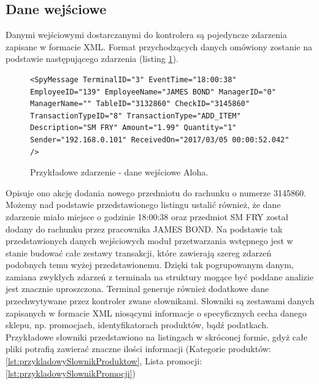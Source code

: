 \documentclass[a4paper]{book}
\begin{document}
\subsection{Dane wejściowe}
Danymi wejściowymi dostarczanymi do kontrolera są pojedyncze zdarzenia zapisane w formacie XML.
Format przychodzących danych omówiony zostanie na podstawie następującego zdarzenia (listing \ref{lst:przykladoweZdarzenieAloha}).  
\begin{figure}[h]
	\begin{lstlisting}[frame=single, breaklines=true]
	<SpyMessage TerminalID="3" EventTime="18:00:38" EmployeeID="139" EmployeeName="JAMES BOND" ManagerID="0" ManagerName="" TableID="3132860" CheckID="3145860" TransactionTypeID="8" TransactionType="ADD_ITEM" Description="SM FRY" Amount="1.99" Quantity="1" Sender="192.168.0.101" ReceivedOn="2017/03/05 00:00:52.042" />
	\end{lstlisting}
	\caption{Przykładowe zdarzenie - dane wejściowe Aloha.}
	\label{lst:przykladoweZdarzenieAloha}
\end{figure}
Opisuje ono akcję dodania nowego przedmiotu do rachunku o numerze 3145860. Możemy nad podstawie przedstawionego listingu ustalić również, że dane zdarzenie miało miejsce o godzinie 18:00:38 oraz przedmiot SM FRY został dodany do rachunku przez pracownika JAMES BOND. Na podstawie tak przedstawionych danych wejściowych moduł przetwarzania wstępnego jest w stanie budować całe zestawy transakcji, które zawierają szereg zdarzeń podobnych temu wyżej przedstawionemu. Dzięki tak pogrupowanym danym, zamiana zwykłych zdarzeń z terminala na struktury mogące być poddane analizie jest znacznie uproszczona. Terminal generuje również dodatkowe dane przechwytywane przez kontroler zwane słownikami. Słowniki są zestawami danych zapisanych w formacie XML niosącymi informacje o specyficznych cecha danego sklepu, np. promocjach, identyfikatorach produktów, bądź podatkach. Przykładowe słowniki przedstawiono na listingach w skróconej formie, gdyż całe pliki potrafią zawierać znaczne ilości informacji (Kategorie produktów: \ref{lst:przykladowySlownikProduktow}, Lista promocji: \ref{lst:przykladowySlownikPromocji})
\end{document}
